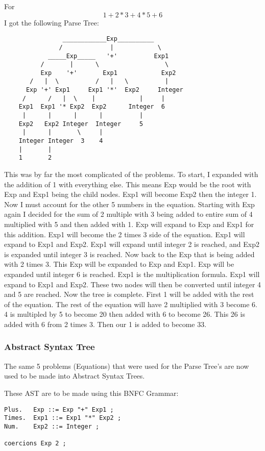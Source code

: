 \documentclass{article}
\theoremstyle{theorem}
\theoremstyle{definition}
\theoremstyle{remark}
\begin{document}
\noindent\newline\newline For $$1+2*3+4*5+6$$ I got the following Parse Tree:
\begin{verbatim}
                ____________Exp__________
               /             |            \
            _____Exp_____   '+'          Exp1
          /       |      \                  \
          Exp    '+'       Exp1            Exp2
       /   |  \          /   |   \          |
      Exp '+' Exp1     Exp1 '*'  Exp2     Integer
     /      /   |  \    |            |     |
    Exp1  Exp1 '* Exp2  Exp2      Integer  6
     |      |      |      |          |
    Exp2   Exp2 Integer  Integer     5
     |      |       \     |
    Integer Integer  3    4
    |       |
    1       2
\end{verbatim}
\noindent\newline This was by far the most complicated of the problems. To start, I expanded with the addition of 1 with everything else. This means Exp would be the root with Exp and Exp1 being the child nodes. Exp1 will become Exp2 then the integer 1. Now I must account for the other 5 numbers in the equation. Starting with Exp again I decided for the sum of 2 multiple with 3 being added to entire sum of 4 multiplied with 5 and then added with 1. Exp will expand to Exp and Exp1 for this addition. Exp1 will become the 2 times 3 side of the equation. Exp1 will expand to Exp1 and Exp2. Exp1 will expand until integer 2 is reached, and Exp2 is expanded until integer 3 is reached. Now back to the Exp that is being added with 2 times 3. This Exp will be expanded to Exp and Exp1. Exp will be expanded until integer 6 is reached. Exp1 is the multiplication formula. Exp1 will expand to Exp1 and Exp2. These two nodes will then be converted until integer 4 and 5 are reached. Now the tree is complete. First 1 will be added with the rest of the equation. The rest of the equation will have 2 multiplied with 3 become 6. 4 is multipled by 5 to become 20 then added with 6 to become 26. This 26 is added with 6 from 2 times 3. Then our 1 is added to become 33.

\subsubsection{Abstract Syntax Tree} The same 5 problems (Equations) that were used for the Parse Tree's are now used to be made into Abstract Syntax Trees.

\noindent\newline\newline These AST are to be made using this BNFC Grammar:
\begin{verbatim}
Plus.   Exp ::= Exp "+" Exp1 ;
Times.  Exp1 ::= Exp1 "*" Exp2 ;
Num.    Exp2 ::= Integer ;

coercions Exp 2 ;
\end{verbatim}
\end{document}
